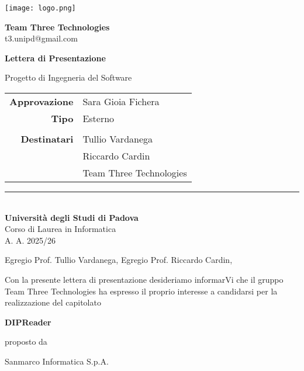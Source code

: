 \documentclass[a4paper,12pt]{article}
\begin{document}
\begin{titlepage}

\onehalfspacing
    \begin{minipage}{0.4\textwidth}
        \texttt{[image: logo.png]}
    \end{minipage}
    \begin{minipage}{0.7\textwidth}
        \raggedright
        \Large\textbf{Team Three Technologies}\\
        \large{t3.unipd@gmail.com}\\
    \end{minipage}
    \vspace{1.5cm}
    \begin{center}
    {\Huge \bfseries Lettera di Presentazione\par}
    \vspace{0.6cm}
    
    {\Large Progetto di Ingegneria del Software\par}
    \vspace{0.3cm}
    \end{center}

\vfill
\begin{tabular}{r|l}
\textbf{Approvazione} & Sara Gioia Fichera \\
\textbf{Tipo} & Esterno\\
\\
\textbf{Destinatari} & Tullio Vardanega \\
& Riccardo Cardin \\
& Team Three Technologies \\
\end{tabular}
\vfill
    
    \noindent\rule{0.7\textwidth}{0.4pt}\\[0.5cm]
    \large\textbf{Università degli Studi di Padova}\\
    \large Corso di Laurea in Informatica\\
    \small A. A. 2025/26

    
\end{titlepage}

\newpage

\noindent Egregio Prof. Tullio Vardanega, \newline
Egregio Prof. Riccardo Cardin, \newline


Con la presente lettera di presentazione desideriamo informarVi che il gruppo Team Three Technologies ha espresso il proprio interesse a candidarsi per la realizzazione del capitolato \begin{center}
    {\large \textbf{DIPReader}} \\[0.5cm]
\end{center} proposto da \begin{center}
    {\large Sanmarco Informatica S.p.A.}
\end{center}
\end{document}
